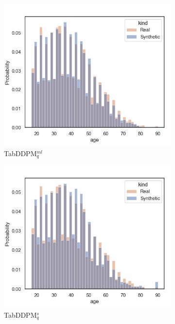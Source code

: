 \begin{figure}[h]
\begin{subfigure}{0.23\textwidth}
		\centering
		\includegraphics[width=\textwidth]{images/dist_age/tab-ddpm.jpg}
		\caption{TabDDPM$^{ml}_q$}
	\end{subfigure}
	\begin{subfigure}{0.23\textwidth}
		\centering
		\includegraphics[width=\textwidth]{images/dist_age/tab-ddpm-simTune.jpg}
		\caption{TabDDPM$^{s}_q$}
	\end{subfigure}
	\begin{subfigure}{0.23\textwidth}
		\centering

\end{subfigure}
\end{figure}
